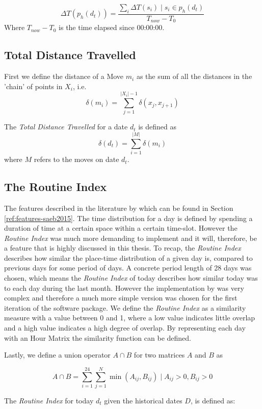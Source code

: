 $$\Delta T(p_{h} (d_t) )= \frac{\sum_i \Delta T(s_i) \;|\; s_i \in p_h (d_t)}{T_{now} - T_{0}}$$
Where $T_{now} - T_0$ is the time elapsed since 00:00:00.

\subsection{Total Distance Travelled}
First we define the distance of a Move $m_i$ as the sum of all the distances in the 'chain' of points in $X_i$, i.e.
$$\delta (m_i)  = \sum_{j=1}^{|X_i|-1} \delta (x_j, x_{j+1})$$

The \textit{Total Distance Travelled} for a date $d_t$ is defined as $$\delta (d_t) = \sum_{i=1}^{|M|} \delta (m_i) $$ where $M$ refers to the moves on date $d_t$.

\subsection{The Routine Index}
The features described in the literature by \cite{Saeb2015} which can be found in Section \ref{ref:features-saeb2015}. The time distribution for a day is defined by spending a duration of time at a certain space within a certain time-slot.  However the \textit{Routine Index} \cite{Saeb2015, Canzian2015} was much more demanding to implement and it will, therefore, be a feature that is highly discussed in this thesis. To recap, the \textit{Routine Index} describes how similar the place-time distribution of a given day is, compared to previous days for some period of days. A concrete period length of 28 days was chosen, which means the \textit{Routine Index} of today describes how similar today was to each day during the last month. However the implementation by \cite{Canzian2015} was very complex and therefore a much more simple version was chosen for the first iteration of the software package. We define the \textit{Routine Index} as a similarity measure with a value between 0 and 1, where a low value indicates little overlap and a high value indicates a high degree of overlap. By representing each day with an Hour Matrix the similarity function can be defined.

Lastly, we define a union operator $A \cap B$ for two matrices $A$ and $B$ as 

$$A \cap B = \sum_{i=1}^{24} \sum_{j=1}^{N} \min (A_{ij}, B_{ij}) \;|\; A_{ij} > 0, B_{ij} > 0$$

The \textit{Routine Index} for today $d_t$ given the historical dates $D$, is defined as: 

